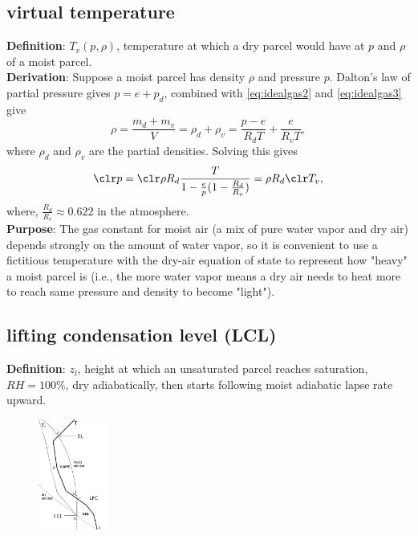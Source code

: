 \subsection{virtual temperature}

{\bf Definition}: $T_v(p,\rho)$, temperature at which a dry parcel would have at $p$ and $\rho$ of a
moist parcel. \\

{\bf Derivation}: Suppose a moist parcel has density $\rho$ and pressure $p$.
Dalton's law of partial pressure gives $p = e + p_d$, combined with \eqref{eq:idealgas2} and
\eqref{eq:idealgas3} give
\begin{equation}
   \rho = \frac{m_d + m_v}{V} = \rho_d + \rho_v = \frac{p-e}{R_dT} + \frac{e}{R_vT}, 
\end{equation}
where $\rho_d$ and $\rho_v$ are the partial densities.
Solving this gives
\begin{equation}
   {\clr p} = {\clr \rho} R_d \frac{T}{1-\frac{e}{p}(1-\frac{R_d}{R_v})} = \rho R_d {\clr T_v},
\end{equation}
where, $\frac{R_d}{R_v} \approx 0.622$ in the atmosphere. \\

{\bf Purpose}:
The gas constant for moist air (a mix of pure water vapor and dry air) depends strongly on the
amount of water vapor, so it is convenient to use a fictitious temperature with the dry-air equation
of state to represent how "heavy" a moist parcel is (i.e., the more water vapor means a dry air
needs to heat more to reach same pressure and density to become "light"). \\

\subsection{lifting condensation level (LCL)}
{\bf Definition}: $z_l$, height at which an unsaturated parcel reaches saturation, $RH=100\%$, dry
adiabatically, then starts following moist adiabatic lapse rate upward. 
\begin{figure} [H] 
   \includegraphics[width=0.2\textwidth, height=0.3\textwidth]{sounding.png}
   \caption{\label{sounding}}
\end{figure}

